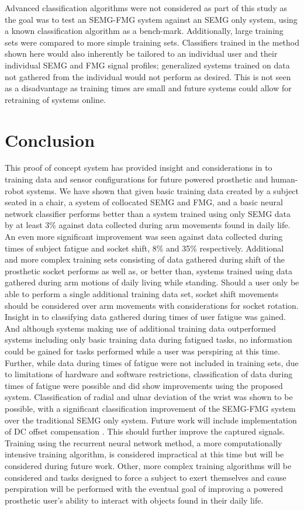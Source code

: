 \documentclass[twocolumn]{sagej}
\begin{document}
Advanced classification algorithms were not considered as part of this study as the goal was to test an SEMG-FMG system against an SEMG only system, using a known classification algorithm as a bench-mark. Additionally, large training sets were compared to more simple training sets.  Classifiers trained in the  method shown here would also inherently be tailored to an individual user and their individual SEMG and FMG signal profiles; generalized systems trained on data not gathered from the individual would not perform as desired.  This is not seen as a disadvantage as training times are small and future systems could allow for retraining of systems online. 

\section*{Conclusion}
\label{sec:conclusion}

This proof of concept system has provided insight and considerations in to training data and sensor configurations for future powered prosthetic and human-robot systems.  We have shown that given basic training data created by a subject seated in a chair, a system of collocated SEMG and FMG, and a basic neural network classifier performs better than a system trained using only SEMG data by at least 3\% against data collected during arm movements found in daily life. An even more significant improvement was seen against data collected during times of subject fatigue and socket shift, 8\% and 35\% respectively.  Additional and more complex training sets consisting of data gathered during shift of the prosthetic socket performs as well as, or better than, systems trained using data gathered during arm motions of daily living while standing.  Should a user only be able to perform a single additional training data set, socket shift movements should be considered over arm movements with considerations for socket rotation.  Insight in to classifying data gathered during times of user fatigue was gained. And although systems making use of additional training data outperformed systems including only basic training data during fatigued tasks, no information could be gained for tasks performed while a user was perspiring at this time.  Further, while data during times of fatigue were not included in training sets, due to limitations of hardware and software restrictions, classification of data during times of fatigue were possible and did show improvements using the proposed system. Classification of radial and ulnar deviation of the wrist was shown to be possible, with a significant classification improvement of the SEMG-FMG system over the traditional SEMG only system. Future work will include implementation of DC offset compensation \cite{Tomasini2015}. This should further improve the captured signals.  Training using the recurrent neural network method, a more computationally intensive training algorithm, is considered impractical at this time but will be considered during future work.  Other, more complex training algorithms will be considered and tasks designed to force a subject to exert themselves and cause perspiration will be performed with the eventual goal of improving a powered prosthetic user's ability to interact with objects found in their daily life.
\end{document}
